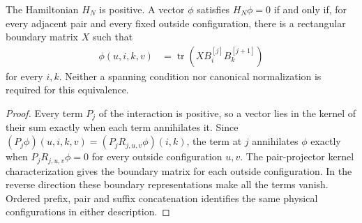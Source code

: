 \begin{lemma}
    \label{lem:varying_obc_parent_kernel_sections}
    \leanok
    The Hamiltonian $H_N$ is positive. A vector $\phi$ satisfies $H_N\phi=0$
    if and only if, for every adjacent
    pair and every fixed outside configuration, there is a
    rectangular boundary matrix $X$ such that
    \begin{align}
        \phi(u,i,k,v) & =\operatorname{tr}(XB^{[j]}_iB^{[j+1]}_k)
    \end{align}
    for every $i,k$. Neither a spanning condition nor canonical
    normalization is required for this equivalence.
\end{lemma}
\begin{proof}\leanok
    Every term $P_j$ of the interaction is positive, so a vector lies in the
    kernel of their sum exactly when each term annihilates it. Since
    $(P_j\phi)(u,i,k,v)=(P_jR_{j,u,v}\phi)(i,k)$, the term at $j$ annihilates
    $\phi$ exactly when $P_jR_{j,u,v}\phi=0$ for every outside configuration
    $u,v$. The pair-projector kernel
    characterization gives the boundary matrix for each outside configuration.
    In the reverse direction these boundary representations make all the
    terms vanish. Ordered prefix, pair and suffix concatenation
    identifies the same physical configurations in either description.
\end{proof}


